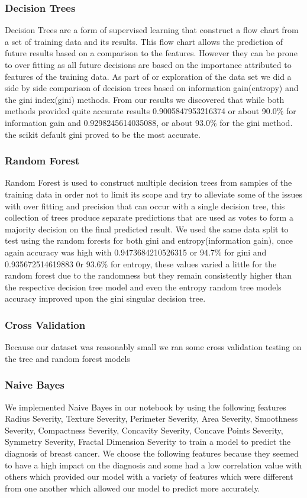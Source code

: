 \documentclass[conference]{IEEEtran}
\begin{document}
\subsubsection{Decision Trees}
Decision Trees are a form of supervised learning that construct a flow chart from a set of training data and its results. This flow chart allows the prediction of future results based on a comparison to the features. However they can be prone to over fitting as all future decisions are based on the importance attributed to features of the training data. As part of or exploration of the data set we did a side by side comparison of decision trees based on information gain(entropy) and the gini index(gini) methods.
From our results we discovered that while both methods provided quite accurate results 0.9005847953216374 or about 90.0\% for information gain and 0.9298245614035088, or about 93.0\% for the gini method. the scikit default gini proved to be the most accurate.
\subsubsection{Random Forest} Random Forest is used to construct multiple decision trees from samples of the training data in order not to limit its scope and try to alleviate some of the issues with over fitting and precision that can occur with a single decision tree, this collection of trees produce separate predictions that are used as votes to form a majority decision on the final predicted result. We used the same data split to test using the random forests for both gini and entropy(information gain), once again accuracy was high with 0.9473684210526315 or 94.7\% for gini and 0.935672514619883 0r 93.6\% for entropy, these values varied a little for the random forest due to the randomness but they remain consistently higher than the respective decision tree model and even the entropy random tree models accuracy improved upon the gini singular decision tree. 
\subsubsection{Cross Validation} Because our dataset was reasonably small we ran some cross validation testing on the tree and random forest models 
\subsubsection{Naive Bayes}
We implemented Naive Bayes in our notebook by using the following features Radius Severity, Texture Severity, Perimeter Severity, Area Severity, Smoothness Severity, Compactness Severity, Concavity Severity, Concave Points Severity, Symmetry Severity, Fractal Dimension Severity to train a model to predict the diagnosis of breast cancer.  We choose the following features because they seemed to have a high impact on the diagnosis and some had a low correlation value with others which provided our model with a variety of features which were different from one another which allowed our model to predict more accurately.
\end{document}
